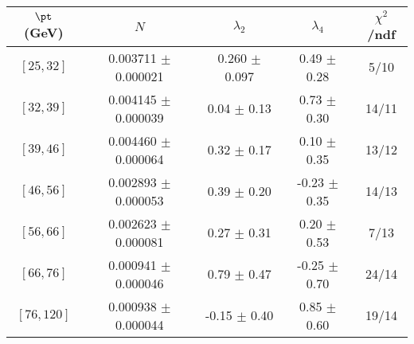 \begin{tabular}{c||c|c|c|c}
$\pt$ (GeV) & $N$ & $\lambda_{2}$ & $\lambda_4$  & $\chi^2$/ndf  \\
\hline
$[25, 32]$ & 0.003711 $\pm$ 0.000021 & 0.260 $\pm$ 0.097 & 0.49 $\pm$ 0.28 & 5/10\\
$[32, 39]$ & 0.004145 $\pm$ 0.000039 & 0.04 $\pm$ 0.13 & 0.73 $\pm$ 0.30 & 14/11\\
$[39, 46]$ & 0.004460 $\pm$ 0.000064 & 0.32 $\pm$ 0.17 & 0.10 $\pm$ 0.35 & 13/12\\
$[46, 56]$ & 0.002893 $\pm$ 0.000053 & 0.39 $\pm$ 0.20 & -0.23 $\pm$ 0.35 & 14/13\\
$[56, 66]$ & 0.002623 $\pm$ 0.000081 & 0.27 $\pm$ 0.31 & 0.20 $\pm$ 0.53 & 7/13\\
$[66, 76]$ & 0.000941 $\pm$ 0.000046 & 0.79 $\pm$ 0.47 & -0.25 $\pm$ 0.70 & 24/14\\
$[76, 120]$ & 0.000938 $\pm$ 0.000044 & -0.15 $\pm$ 0.40 & 0.85 $\pm$ 0.60 & 19/14\\
\end{tabular}
